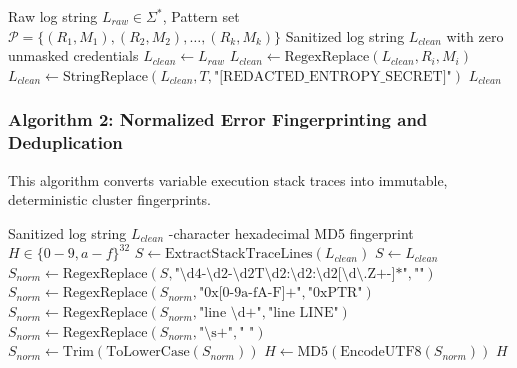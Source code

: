\documentclass[12pt,a4paper]{article}
\begin{document}
\begin{algorithm}[H]
\caption{Deterministic Pre-Flight Log Sanitization Engine}
\label{alg:sanitization_engine}
\begin{algorithmic}[1]
\Require Raw log string $L_{raw} \in \Sigma^*$, Pattern set $\mathcal{P} = \{(R_1, M_1), (R_2, M_2), \dots, (R_k, M_k)\}$
\Ensure Sanitized log string $L_{clean}$ with zero unmasked credentials
\State $L_{clean} \gets L_{raw}$
    \State {}
    \State $L_{clean} \gets \text{RegexReplace}(L_{clean}, R_i, M_i)$
\EndFor
\State {}
        \State $L_{clean} \gets \text{StringReplace}(L_{clean}, T, \text{"[REDACTED\_ENTROPY\_SECRET]"})$
    \EndIf
\EndFor
\State \Return $L_{clean}$
\end{algorithmic}
\end{algorithm}

\subsubsection{Algorithm 2: Normalized Error Fingerprinting and Deduplication}
This algorithm converts variable execution stack traces into immutable, deterministic cluster fingerprints.

\begin{algorithm}[H]
\caption{Normalized Stack Trace Fingerprint Generation}
\label{alg:fingerprinting}
\begin{algorithmic}[1]
\Require Sanitized log string $L_{clean}$
-character hexadecimal MD5 fingerprint $H \in \{0-9, a-f\}^{32}$
\State {}
\State $S \gets \text{ExtractStackTraceLines}(L_{clean})$
    \State $S \gets L_{clean}$ 
\EndIf
\State {}
\State $S_{norm} \gets \text{RegexReplace}(S, \text{"\textbackslash d{4}-\textbackslash d{2}-\textbackslash d{2}T\textbackslash d{2}:\textbackslash d{2}:\textbackslash d{2}[\textbackslash d\textbackslash .Z+-]*"}, \text{""})$ 
\State $S_{norm} \gets \text{RegexReplace}(S_{norm}, \text{"0x[0-9a-fA-F]+"}, \text{"0xPTR"})$ 
\State $S_{norm} \gets \text{RegexReplace}(S_{norm}, \text{"line \textbackslash d+"}, \text{"line LINE"})$ 
\State $S_{norm} \gets \text{RegexReplace}(S_{norm}, \text{"\textbackslash s+"}, \text{" "})$ 
\State $S_{norm} \gets \text{Trim}(\text{ToLowerCase}(S_{norm}))$
\State {}
\State $H \gets \text{MD5}(\text{EncodeUTF8}(S_{norm}))$
\State \Return $H$
\end{algorithmic}
\end{algorithm}
\end{document}
